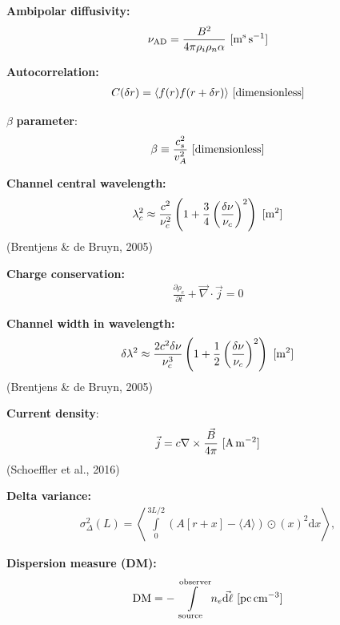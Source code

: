 \documentclass[a4paper,10pt]{article}
\begin{document}
{\noindent}\textbf{Ambipolar diffusivity:}
\begin{align*}
    \nu_\mathrm{AD} = \dfrac{B^2}{4\pi\rho_i\rho_n\alpha} ~ [{\rm m^s\,s^{-1}}]
\end{align*}

{\noindent}\textbf{Autocorrelation:}
\begin{align*}
    C(\delta r) = \langle f(r)f(r+\delta r)\rangle ~ [{\rm dimensionless}]
\end{align*}

{\noindent}$\beta$ \textbf{parameter}: 
\begin{align*}
    \beta \equiv \frac{c_s^2}{v_A^2} ~ [{\rm dimensionless}]
\end{align*}

{\noindent}\textbf{Channel central wavelength:} 
\begin{align*}
\lambda_c^2 \approx \dfrac{c^2}{\nu_c^2} \left(1+\dfrac{3}{4}\left(\dfrac{\delta\nu}{\nu_c}\right)^2\right) ~ [{\rm m^2}]
\end{align*}
(Brentjens \& de Bruyn, 2005)

{\noindent}\textbf{Charge conservation:} 
\begin{align*}
    \frac{\partial\rho_e}{\partial t} + \vec\nabla\cdot\vec{j} = 0
\end{align*}

{\noindent}\textbf{Channel width in wavelength:} 
\begin{align*}
\delta\lambda^2 \approx \dfrac{2c^2\delta\nu}{\nu_c^3} \left(1+\dfrac{1}{2}\left(\dfrac{\delta\nu}{\nu_c}\right)^2\right) ~ [{\rm m^2}]
\end{align*}
(Brentjens \& de Bruyn, 2005)

{\noindent}\textbf{Current density}:
\begin{align*}
    \vec{j} = c\nabla\times\frac{\vec{B}}{4\pi} ~ [{\rm A\,m^{-2}}]
\end{align*}
(Schoeffler et al., 2016)

{\noindent}\textbf{Delta variance:}
\begin{align*}
    \sigma_\Delta^2(L) = \left\langle \int\limits_0^{3L/2} {(A[r+x]-\langle A\rangle)\odot(x)}^2\mathrm{d}x \right\rangle,
\end{align*}

{\noindent}\textbf{Dispersion measure (DM):}
\begin{align*}
    {\rm DM} = -\int\limits_\mathrm{source}^\mathrm{observer} n_e\vec{{\rm d}\ell} ~ [{\rm pc\,cm^{-3}}]
\end{align*}
\end{document}
